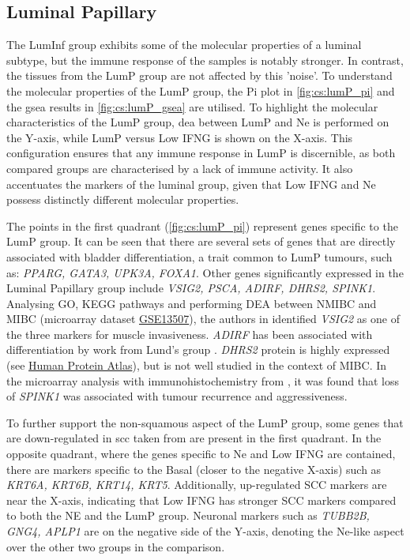 \subsection{Luminal Papillary} \label{s:cs:lumP_interp}

The LumInf group exhibits some of the molecular properties of a luminal subtype, but the immune response of the samples is notably stronger. In contrast, the tissues from the LumP group are not affected by this 'noise'. To understand the molecular properties of the LumP group, the Pi plot in \cref{fig:cs:lumP_pi} and the \acrshort{gsea} results in \cref{fig:cs:lumP_gsea} are utilised. To highlight the molecular characteristics of the LumP group, \acrshort{dea} between LumP and Ne is performed on the Y-axis, while LumP versus Low IFNG is shown on the X-axis. This configuration ensures that any immune response in LumP is discernible, as both compared groups are characterised by a lack of immune activity. It also accentuates the markers of the luminal group, given that Low IFNG and Ne possess distinctly different molecular properties.

The points in the first quadrant (\cref{fig:cs:lumP_pi}) represent genes specific to the LumP group. It can be seen that there are several sets of genes that are directly associated with bladder differentiation, a trait common to LumP tumours, such as: \textit{PPARG, GATA3, UPK3A, FOXA1}. Other genes significantly expressed in the Luminal Papillary group include \textit{VSIG2, PSCA, ADIRF, DHRS2, SPINK1}. Analysing GO, KEGG pathways and performing DEA between NMIBC and MIBC (microarray dataset \href{https://www.ncbi.nlm.nih.gov/geo/query/acc.cgi?acc=GSE13507}{GSE13507}), the authors in \citet{He2021-de} identified \textit{VSIG2} as one of the three markers for muscle invasiveness. \textit{ADIRF} has been associated with differentiation by work from Lund's group \citet{Eriksson2015-lt}. \textit{DHRS2} protein is highly expressed (see \href{https://www.proteinatlas.org/ENSG00000100867-DHRS2/tissue/urinary+bladder}{Human Protein Atlas}), but is not well studied in the context of MIBC. In the microarray analysis with immunohistochemistry from \citet{Rink2013-sv}, it was found that loss of \textit{SPINK1} was associated with tumour recurrence and aggressiveness.

To further support the non-squamous aspect of the LumP group, some genes that are down-regulated in \acrfull{scc} taken from \citet{Knowles2015-mu} are present in the first quadrant. In the opposite quadrant, where the genes specific to Ne and Low IFNG are contained, there are markers specific to the Basal (closer to the negative X-axis) such as \textit{KRT6A, KRT6B, KRT14, KRT5}. Additionally, up-regulated SCC markers are near the X-axis, indicating that Low IFNG has stronger SCC markers compared to both the NE and the LumP group. Neuronal markers such as \textit{TUBB2B, GNG4, APLP1} are on the negative side of the Y-axis, denoting the Ne-like aspect over the other two groups in the comparison.

